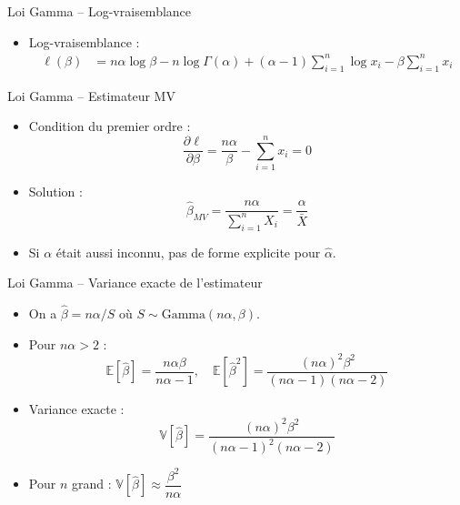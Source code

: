 \documentclass[11pt,aspectratio=169]{beamer}
\begin{document}
\begin{frame}{Loi Gamma -- Log-vraisemblance}

\begin{itemize}

\item Log-vraisemblance :
  \begin{align*}
  \ell(\beta) &= n\alpha \log \beta - n \log \Gamma(\alpha) + (\alpha - 1)\sum_{i=1}^n \log x_i - \beta \sum_{i=1}^n x_i
  \end{align*}

\end{itemize}

\end{frame}

\begin{frame}{Loi Gamma -- Estimateur MV}

\begin{itemize}

\item Condition du premier ordre :
  \[
  \frac{\partial \ell}{\partial \beta} = \frac{n\alpha}{\beta} - \sum_{i=1}^n x_i = 0
  \]

\item Solution :
  \[
  \boxed{\hat{\beta}_{MV} = \frac{n\alpha}{\sum_{i=1}^n X_i} = \frac{\alpha}{\bar{X}}}
  \]

\item Si $\alpha$ était aussi inconnu, pas de forme explicite pour $\hat{\alpha}$.

\end{itemize}

\end{frame}

\begin{frame}{Loi Gamma -- Variance exacte de l'estimateur}

\begin{itemize}

\item On a $\hat{\beta} = n\alpha/S$ où $S \sim \text{Gamma}(n\alpha, \beta)$.\newline

\item Pour $n\alpha > 2$ :
  \[
  \mathbb{E}[\hat{\beta}] = \frac{n\alpha \beta}{n\alpha - 1}, \quad \mathbb{E}[\hat{\beta}^2] = \frac{(n\alpha)^2 \beta^2}{(n\alpha - 1)(n\alpha - 2)}
  \]

\item Variance exacte :
  \[
  \boxed{\mathbb{V}[\hat{\beta}] = \frac{(n\alpha)^2 \beta^2}{(n\alpha - 1)^2(n\alpha - 2)}}
  \]

\item Pour $n$ grand : $\mathbb{V}[\hat{\beta}] \approx \dfrac{\beta^2}{n\alpha}$

\end{itemize}

\end{frame}
\end{document}
